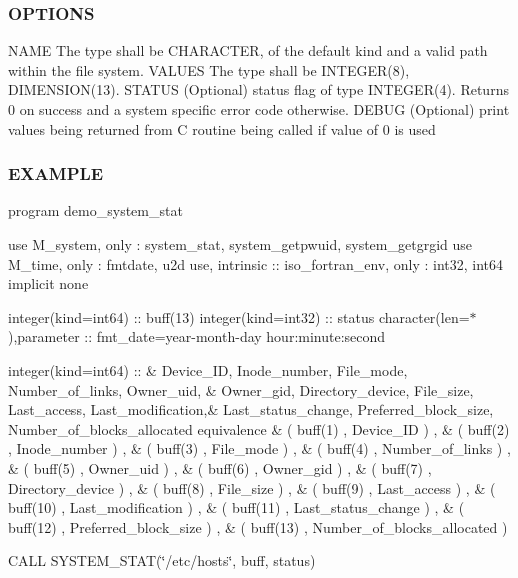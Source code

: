 \subsubsection*{O\+P\+T\+I\+O\+NS}

\begin{DoxyVerb}NAME    The type shall be CHARACTER, of the default kind and a valid
        path within the file system.
VALUES  The type shall be INTEGER(8), DIMENSION(13).
STATUS  (Optional) status flag of type INTEGER(4). Returns 0 on success
        and a system specific error code otherwise.
DEBUG   (Optional) print values being returned from C routine being
        called if value of 0 is used
\end{DoxyVerb}


\subsubsection*{E\+X\+A\+M\+P\+LE}

program demo\+\_\+system\+\_\+stat

use M\+\_\+system, only \+: system\+\_\+stat, system\+\_\+getpwuid, system\+\_\+getgrgid use M\+\_\+time, only \+: fmtdate, u2d use, intrinsic \+:\+: iso\+\_\+fortran\+\_\+env, only \+: int32, int64 implicit none

integer(kind=int64) \+:\+: buff(13) integer(kind=int32) \+:\+: status character(len=$\ast$),parameter \+:\+: fmt\+\_\+date=\textquotesingle{}year-\/month-\/day hour\+:minute\+:second\textquotesingle{}

integer(kind=int64) \+:\+: \& Device\+\_\+\+ID, Inode\+\_\+number, File\+\_\+mode, Number\+\_\+of\+\_\+links, Owner\+\_\+uid, \& Owner\+\_\+gid, Directory\+\_\+device, File\+\_\+size, Last\+\_\+access, Last\+\_\+modification,\& Last\+\_\+status\+\_\+change, Preferred\+\_\+block\+\_\+size, Number\+\_\+of\+\_\+blocks\+\_\+allocated equivalence \& ( buff(1) , Device\+\_\+\+ID ) , \& ( buff(2) , Inode\+\_\+number ) , \& ( buff(3) , File\+\_\+mode ) , \& ( buff(4) , Number\+\_\+of\+\_\+links ) , \& ( buff(5) , Owner\+\_\+uid ) , \& ( buff(6) , Owner\+\_\+gid ) , \& ( buff(7) , Directory\+\_\+device ) , \& ( buff(8) , File\+\_\+size ) , \& ( buff(9) , Last\+\_\+access ) , \& ( buff(10) , Last\+\_\+modification ) , \& ( buff(11) , Last\+\_\+status\+\_\+change ) , \& ( buff(12) , Preferred\+\_\+block\+\_\+size ) , \& ( buff(13) , Number\+\_\+of\+\_\+blocks\+\_\+allocated )

C\+A\+LL S\+Y\+S\+T\+E\+M\+\_\+\+S\+T\+AT(\char`\"{}/etc/hosts\char`\"{}, buff, status)

